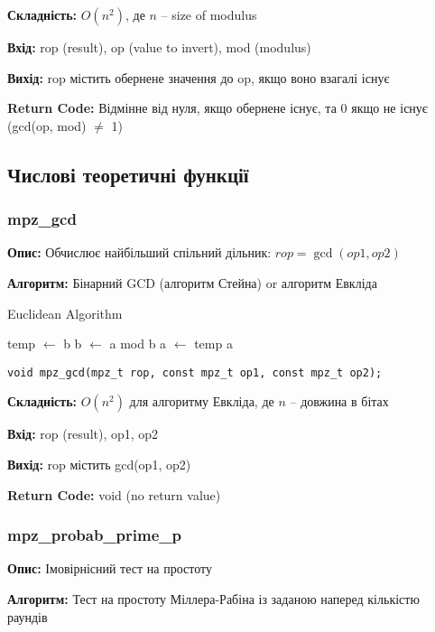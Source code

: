 \textbf{Складність:} $O(n^{2})$, де $n$ -- size of modulus

\textbf{Вхід:} rop (result), op (value to invert), mod (modulus)

\textbf{Вихід:} rop містить обернене значення до op, якщо воно взагалі існує

\textbf{Return Code:} Відмінне від нуля, якщо обернене існує, та 0 якщо не існує (gcd(op, mod) $\neq$ 1)

\subsection{Числові теоретичні функції}

\subsubsection{mpz\_gcd}
\textbf{Опис:} Обчислює найбільший спільний дільник: $rop = \gcd(op1, op2)$

\textbf{Алгоритм:} Бінарний GCD (алгоритм Стейна) or алгоритм Евкліда

\begin{algorithm}
    \caption{Euclidean Algorithm}
    \begin{algorithmic}[1]
        \State temp $\gets$ b
        \State b $\gets$ a mod b
        \State a $\gets$ temp
        \EndWhile
        \State \Return a
        \EndFunction
    \end{algorithmic}
\end{algorithm}

\begin{verbatim}
void mpz_gcd(mpz_t rop, const mpz_t op1, const mpz_t op2);
\end{verbatim}

\textbf{Складність:} $O(n^{2})$ для алгоритму Евкліда, де $n$ -- довжина в бітах

\textbf{Вхід:} rop (result), op1, op2

\textbf{Вихід:} rop містить gcd(op1, op2)

\textbf{Return Code:} void (no return value)

\subsubsection{mpz\_probab\_prime\_p}
\textbf{Опис:} Імовірнісний тест на простоту

\textbf{Алгоритм:} Тест на простоту Міллера-Рабіна із заданою наперед кількістю раундів

